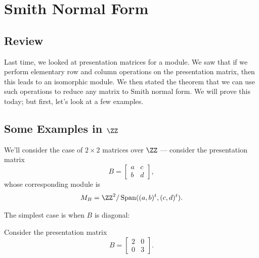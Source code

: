 



\section{Smith Normal Form}

\subsection{Review}

Last time, we looked at presentation matrices for a module. We saw that if we perform elementary row and column operations on the presentation matrix, then this leads to an isomorphic module. We then stated the theorem that we can use such operations to reduce any matrix to Smith normal form. We will prove this today; but first, let's look at a few examples. 

\subsection{Some Examples in \texorpdfstring{$\ZZ$}{Z}}

We'll consider the case of $2 \times 2$ matrices over $\ZZ$ --- consider the presentation matrix \[B = \begin{bmatrix}
a & c \\
b & d
\end{bmatrix},\] whose corresponding module is \[M_B = \ZZ^2/\operatorname{Span}((a, b)^t, (c, d)^t).\] 

The simplest case is when $B$ is diagonal:

\begin{example}
Consider the presentation matrix \[B = \begin{bmatrix} 2 & 0 \\ 0 & 3 \end{bmatrix}.\] 
\end{example}

